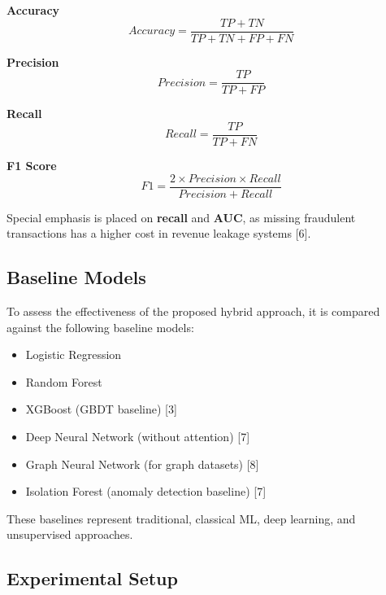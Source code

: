 \documentclass[conference]{IEEEtran}
\begin{document}
\textbf{Accuracy}
\begin{equation}
Accuracy = \frac{TP + TN}{TP + TN + FP + FN}
\end{equation}

\textbf{Precision}
\begin{equation}
Precision = \frac{TP}{TP + FP}
\end{equation}

\textbf{Recall}
\begin{equation}
Recall = \frac{TP}{TP + FN}
\end{equation}

\textbf{F1 Score}
\begin{equation}
F1 = \frac{2 \times Precision \times Recall}{Precision + Recall}
\end{equation}

Special emphasis is placed on \textbf{recall} and \textbf{AUC}, as missing fraudulent transactions has a higher cost in revenue leakage systems [6].

\subsection{Baseline Models}

To assess the effectiveness of the proposed hybrid approach, it is compared against the following baseline models:

\begin{itemize}
    \item Logistic Regression
    \item Random Forest
    \item XGBoost (GBDT baseline) [3]
    \item Deep Neural Network (without attention) [7]
    \item Graph Neural Network (for graph datasets) [8]
    \item Isolation Forest (anomaly detection baseline) [7]
\end{itemize}

These baselines represent traditional, classical ML, deep learning, and unsupervised approaches.

\subsection{Experimental Setup}
\end{document}
